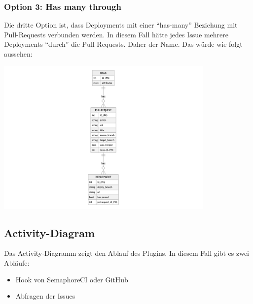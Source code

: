 \subsubsection{Option 3: Has many through}
Die dritte Option ist, dass Deployments mit einer \enquote{has-many} Beziehung mit Pull-Requests verbunden werden. In diesem Fall hätte jedes
Issue mehrere Deployments \enquote{durch} die Pull-Requests. Daher der Name. Das würde wie folgt aussehen:
\begin{center}
  \includegraphics[width=0.8\textwidth]{images/erd/has_many_through.png}
  \label{fig:erd_has_many_through}
\end{center}

\subsection{Activity-Diagram}
\label{sec:activity_diagram}
Das Activity-Diagramm zeigt den Ablauf des Plugins. In diesem Fall gibt es zwei Abläufe:
\begin{itemize}
  \item Hook von SemaphoreCI oder GitHub
  \item Abfragen der Issues \newline
\end{itemize}

